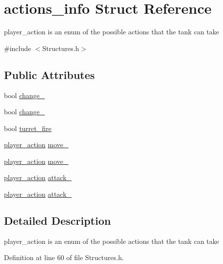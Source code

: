 \hypertarget{structactions__info}{\section{actions\-\_\-info Struct Reference}
\label{structactions__info}
}


player\-\_\-action is an enum of the possible actions that the tank can take  




{\ttfamily \#include $<$Structures.\-h$>$}

\subsection*{Public Attributes}
\begin{DoxyCompactItemize}
\item 
bool \hyperlink{structactions__info_a69ac673533838f973f09492a12516816}{change\-\_}
\item 
bool \hyperlink{structactions__info_a0f20d9c244d92a71dad9cf8ce10cd2f2}{change\-\_}
\item 
bool \hyperlink{structactions__info_afd5886948959786f75255fccbc965154}{turret\-\_\-fire}
\item 
\hyperlink{Structures_8h_abf3d9daa4559fb2f9e16fc1836fead1b}{player\-\_\-action} \hyperlink{structactions__info_a5cb853144009b2bfb7e58c7bf43e2a42}{move\-\_}
\item 
\hyperlink{Structures_8h_abf3d9daa4559fb2f9e16fc1836fead1b}{player\-\_\-action} \hyperlink{structactions__info_adf9ed4a9ad4b604295846d06872e0ebf}{move\-\_}
\item 
\hyperlink{Structures_8h_abf3d9daa4559fb2f9e16fc1836fead1b}{player\-\_\-action} \hyperlink{structactions__info_a722a3805cc06ba6e5f9627b942f9bbf2}{attack\-\_}
\item 
\hyperlink{Structures_8h_abf3d9daa4559fb2f9e16fc1836fead1b}{player\-\_\-action} \hyperlink{structactions__info_a9bfb93ce33b8969b45fa72a12b89be89}{attack\-\_}
\end{DoxyCompactItemize}


\subsection{Detailed Description}
player\-\_\-action is an enum of the possible actions that the tank can take 

Definition at line 60 of file Structures.\-h.



